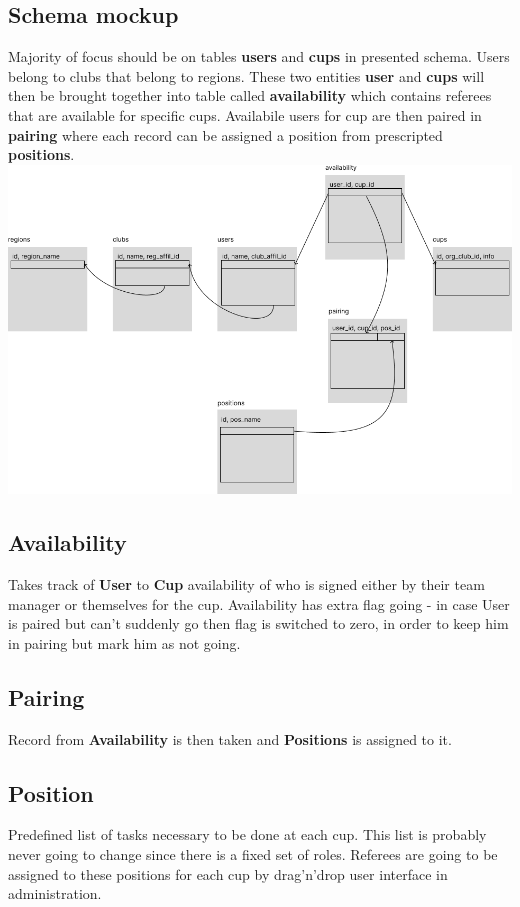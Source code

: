 \subsection*{Schema mockup}
Majority of focus should be on tables \textbf{users} and \textbf{cups} in presented schema. Users belong to clubs that belong to regions. These two entities \textbf{user} and \textbf{cups} will then be brought together into table called \textbf{availability} which contains referees that are available for specific cups. Availabile users for cup are then paired in \textbf{pairing} where each record can be assigned a position from prescripted \textbf{positions}.
\newline
\includegraphics[scale=0.430]{img/swimmpair_db_mockup.png}
\subsection*{Availability}
Takes track of \textbf{User} to \textbf{Cup} availability of who is signed either by their team manager or themselves for the cup. Availability has extra flag going - in case User is paired but can't suddenly go then flag is switched to zero, in order to keep him in pairing but mark him as not going.
\subsection*{Pairing}
Record from \textbf{Availability} is then taken and \textbf{Positions} is assigned to it. 
\subsection*{Position}
Predefined list of tasks necessary to be done at each cup. This list is probably never going to change since there is a fixed set of roles. Referees are going to be assigned to these positions for each cup by drag'n'drop user interface in administration.
\newpage
